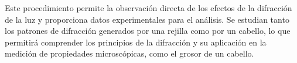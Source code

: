 \documentclass[twocolumn, 12pt]{article}
\begin{document}
Este procedimiento permite la observación directa de los
efectos de la difracción de la luz y proporciona datos
experimentales para el análisis. Se estudian tanto los
patrones de difracción generados por una rejilla como por
un cabello, lo que permitirá comprender los principios de
la difracción y su aplicación en la medición de propiedades
microscópicas, como el grosor de un cabello.

\printbibliography
\end{document}
